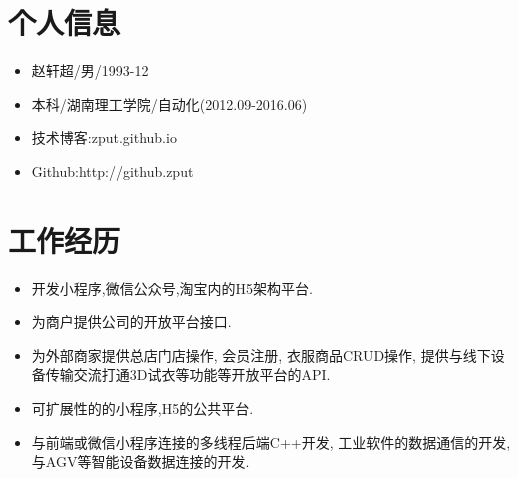 \documentclass{resume}
\begin{document}


 
\section{个人信息}
\begin{itemize}[parsep=0.2ex]
  \item 赵轩超/男/1993-12
  \item 本科/湖南理工学院/自动化(2012.09-2016.06)
  \item 技术博客:zput.github.io
  \item Github:http://github.zput
\end{itemize}

\section{工作经历}
\begin{itemize}[parsep=0.2ex]
  \item 开发小程序,微信公众号,淘宝内的H5架构平台.
  \item 为商户提供公司的开放平台接口.
  \item 为外部商家提供总店门店操作, 会员注册, 衣服商品CRUD操作, 提供与线下设备传输交流打通3D试衣等功能等开放平台的API.
  \item 可扩展性的的小程序,H5的公共平台.
\end{itemize}

\begin{itemize}[parsep=0.2ex]
  \item 与前端或微信小程序连接的多线程后端C++开发, 工业软件的数据通信的开发, 与AGV等智能设备数据连接的开发.
\end{itemize}
\end{document}
